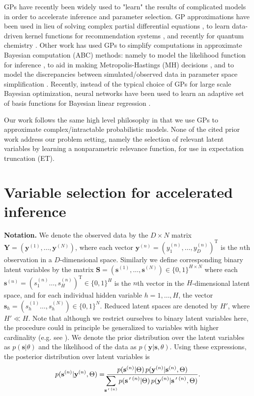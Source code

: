 \documentclass[12pt]{article}
\newcommand{\disS}{\displaystyle}
\newcommand{\Prime}{\,'}  %
\renewcommand{\vec}[1]{{\mathbf{#1}}}
\begin{document}
 
GPs have recently been widely used to "learn" the results of complicated models in order to accelerate inference and parameter selection. 
GP approximations have been used in lieu of solving complex partial differential equations \citep{SacksEtal1989, CurrinEtall1991}, to learn data-driven kernel functions for recommendation systems \citep{SchwaighoferEtAl2005}, and recently for quantum chemistry \citep{RuppEtAl2012}. 
Other work has used GPs to simplify computations in approximate Bayesian computation (ABC) methods: namely to model the likelihood function for inference \citep{Wilkinsons2014}, to aid in making Metropolis-Hastings (MH) decisions \citep{MeedsWelling2014}, and to model the discrepancies between simulated/observed data in parameter space simplification \citep{GuttmanCorander2015}.
Recently, instead of the typical choice of GPs for large scale Bayesian optimization, neural networks have been used to learn an adaptive set of basis functions for Bayesian linear regression \citep{SnoekEtAl2015}.


Our work follows the same high level philosophy in that we use GPs to approximate complex/intractable probabilistic models. None of the cited prior work address our problem setting, namely the selection of relevant latent variables by learning a nonparametric relevance function, for use in expectation truncation (ET).

\section{Variable selection for accelerated inference}
\label{method}
\textbf{Notation.}
We denote the observed data by the $D\times N$ matrix $\vec{Y}=(\vec{y}^{(1)}, \dots, \vec{y}^{(N)})$, where each vector $\vec{y}^{(n)} = ( y_1^{(n)}, \dots, y_D^{(n)})^\mathrm{T}$ is the $n$th observation 
in a $D$-dimensional space.
Similarly we define corresponding 
binary latent variables 
by the matrix $\vec{S} = (\vec{s}^{(1)}, \dots, \vec{s}^{(N)})\in \{0,1\}^{H \times N}$ 
where each $\vec{s}^{(n)}=(s_1^{(n)}\dots, s^{(n)}_H)^\mathrm{T} \in \{0,1\}^{H}$ is the $n$th vector in the $H$-dimensional latent space,
and for each individual hidden variable $h=1,\dots,H$, the vector $\vec{s}_h=(s_h^{(1)}\dots, s^{(N)}_h)\in \{0,1\}^{N}$. 
Reduced latent spaces are denoted by $H'$, where $H' \ll H$. 
Note that although we restrict ourselves to binary latent variables here, 
the procedure could in principle be generalized to variables with higher cardinality (e.g. see \citep{ExarchakisEtAl2012}).
We denote the prior distribution over the latent variables as $p(\vec{s} | \theta)$ 
and the likelihood of the data as $p(\vec{y} | \vec{s}, \theta)$.
Using these expressions, the posterior distribution over latent variables is 
%
\vspace{-.1cm}
\begin{equation}
\label{eq:post}
p(\vec{s}^{(n)}|\vec{y}^{(n)},\Theta)  = \frac{p(\vec{s}^{(n)} | \Theta) \, p(\vec{y}^{(n)} | \vec{s}^{(n)}, \Theta)}
{\disS\hspace{-1.5mm}\sum_{\vec{s}\Prime\,^{(n)}} p(\vec{s}\Prime\,^{(n)} | \Theta) \, p(\vec{y}^{(n)} | \vec{s}\Prime\,^{(n)}, \Theta)}.
\end{equation}
\vspace{-.5cm}
\end{document}
